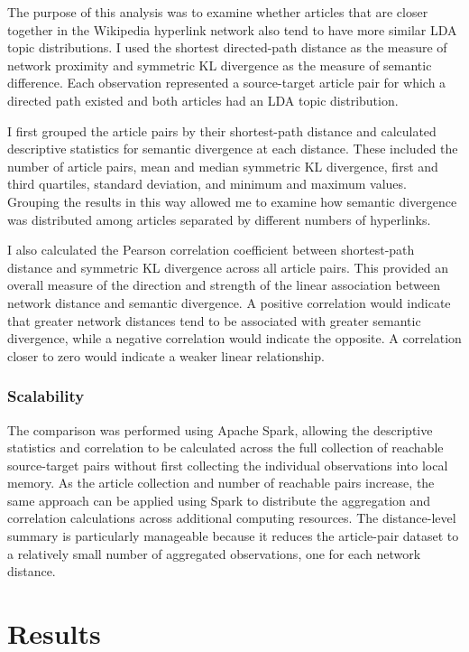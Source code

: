 \documentclass[
  letterpaper,
  DIV=11,
  numbers=noendperiod]{scrartcl}
\begin{document}
The purpose of this analysis was to examine whether articles that are
closer together in the Wikipedia hyperlink network also tend to have
more similar LDA topic distributions. I used the shortest directed-path
distance as the measure of network proximity and symmetric KL divergence
as the measure of semantic difference. Each observation represented a
source-target article pair for which a directed path existed and both
articles had an LDA topic distribution.

I first grouped the article pairs by their shortest-path distance and
calculated descriptive statistics for semantic divergence at each
distance. These included the number of article pairs, mean and median
symmetric KL divergence, first and third quartiles, standard deviation,
and minimum and maximum values. Grouping the results in this way allowed
me to examine how semantic divergence was distributed among articles
separated by different numbers of hyperlinks.

I also calculated the Pearson correlation coefficient between
shortest-path distance and symmetric KL divergence across all article
pairs. This provided an overall measure of the direction and strength of
the linear association between network distance and semantic divergence.
A positive correlation would indicate that greater network distances
tend to be associated with greater semantic divergence, while a negative
correlation would indicate the opposite. A correlation closer to zero
would indicate a weaker linear relationship.

\subsubsection{Scalability}\label{scalability-3}

The comparison was performed using Apache Spark, allowing the
descriptive statistics and correlation to be calculated across the full
collection of reachable source-target pairs without first collecting the
individual observations into local memory. As the article collection and
number of reachable pairs increase, the same approach can be applied
using Spark to distribute the aggregation and correlation calculations
across additional computing resources. The distance-level summary is
particularly manageable because it reduces the article-pair dataset to a
relatively small number of aggregated observations, one for each network
distance.

\section{Results}\label{results}
\end{document}
